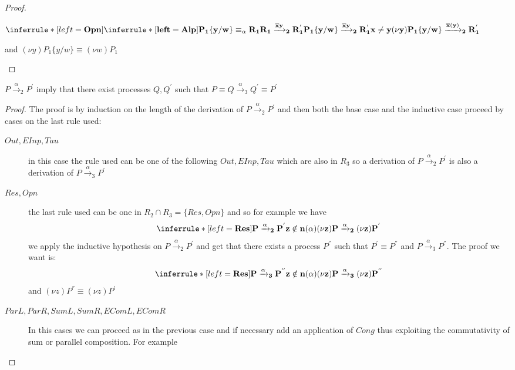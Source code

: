 \begin{lemma}
\begin{proof}
\begin{description}
	\begin{center}
	  $\inferrule* [left=\bf{Opn}]{
	      \inferrule* [left=\bf{Alp}]{
		  P_{1}\{y/w\} \equiv_{\alpha} R_{1}
		\\
		  R_{1} \xrightarrow{\overline{x}y}_{2} R_{1}^{'}
	      }{
		P_{1}\{y/w\} \xrightarrow{\overline{x}y}_{2} R_{1}^{'}
	      }
	    \\
	      x\neq y
	  }{
	    (\nu y)P_{1}\{y/w\} \xrightarrow{\overline{x}(y)}_{2} R_{1}^{'}
	  }$
	\end{center}
	and $(\nu y)P_{1}\{y/w\} \equiv (\nu w)P_{1}$
    \end{description}
  \end{proof}
\end{lemma}


\begin{lemma}\label{2inCong3}
  $P\xrightarrow{\alpha}_{2} P^{'}$ imply that there exist processes $Q, Q^{'}$ such that  $P \equiv Q \xrightarrow{\alpha}_{3} Q^{'} \equiv P^{'}$
  \begin{proof}
    The proof is by induction on the length of the derivation of $P\xrightarrow{\alpha}_{2}P^{'}$ and then both the base case and the inductive case proceed by cases on the last rule used:
    \begin{description}
      \item[$Out, EInp, Tau$]
	in this case the rule used can be one of the following $Out, EInp, Tau$ which are also in $R_{3}$ so a derivation of $P\xrightarrow{\alpha}_{2}P^{'}$ is also a derivation of $P\xrightarrow{\alpha}_{3}P^{'}$
      \item[$Res, Opn$]
		the last rule used can be one in $R_{2}\cap R_{3}=\{Res, Opn\}$ and so for example we have 
		\[
		  \inferrule* [left=\bf{Res}]{
		      P\xrightarrow{\alpha}_{2} P^{'}
		    \\
		      z\notin n(\alpha)
		  }{
		    (\nu z) P\xrightarrow{\alpha}_{2}(\nu z) P^{'}
		  }
		\]
		we apply the inductive hypothesis on $P\xrightarrow{\alpha}_{2} P^{'}$ and get that there exists a process $P^{''}$ such that $P^{'}\equiv P^{''}$ and $P\xrightarrow{\alpha}_{3} P^{''}$. The proof we want is:
		\[
		  \inferrule* [left=\bf{Res}]{
		      P\xrightarrow{\alpha}_{3} P^{''}
		    \\
		      z\notin n(\alpha)
		  }{
		    (\nu z) P\xrightarrow{\alpha}_{3}(\nu z) P^{''}
		  }
		\]
		and $(\nu z) P^{''}\equiv (\nu z) P^{'}$
      \item[$ParL, ParR, SumL, SumR, EComL, EComR$]
		In this cases we can proceed as in the previous case and if necessary add an application of $Cong$ thus exploiting the commutativity of sum or parallel composition. For example

\end{description}
\end{proof}
\end{lemma}
